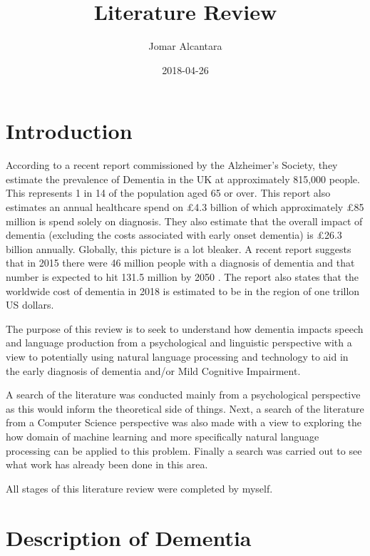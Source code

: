 \documentclass[a4paper]{article}
\title{Literature Review}
\date{2018-04-26}
\author{Jomar Alcantara}
\begin{document}
\maketitle
\newpage
\tableofcontents
\newpage
\section{Introduction}

\par
According to a recent report commissioned by the Alzheimer's Society, they estimate the prevalence of Dementia in the UK at approximately 815,000 people. This represents 1 in 14 of the population aged 65 or over. This report also estimates an annual healthcare spend on £4.3 billion of which approximately £85 million is spend solely on diagnosis. They also estimate that the overall impact of dementia (excluding the costs associated with early onset dementia) is £26.3 billion annually. Globally, this picture is a lot bleaker. A recent report suggests that in 2015 there were 46 million people with a diagnosis of dementia and that number is expected to hit 131.5 million by 2050 \cite{Prince2015}. The report also states that the worldwide cost of dementia in 2018 is estimated to be in the region of one trillon US dollars.
\newline
\par
The purpose of this review is to seek to understand how dementia impacts speech and language production from a psychological and linguistic perspective with a view to potentially using natural language processing and technology to aid in the early diagnosis of dementia and/or Mild Cognitive Impairment.
\newline
\par
A search of the literature was conducted mainly from a psychological perspective as this would inform the theoretical side of things. Next, a search of the literature from a Computer Science perspective was also made with a view to exploring the how domain of machine learning and more specifically natural language processing can be applied to this problem. Finally a search was carried out to see what work has already been done in this area.

All stages of this literature review were completed by myself. 

\section{Description of Dementia}
\end{document}
